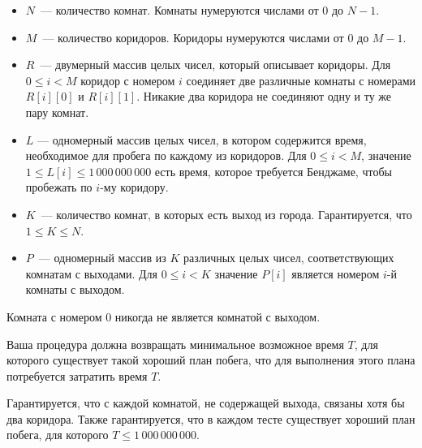 \begin{itemize}
\item $N$~--- количество комнат. Комнаты нумеруются числами от $0$ до $N-1$.
\item $M$~--- количество коридоров. Коридоры нумеруются числами от $0$ до $M-1$.
\item $R$~--- двумерный массив целых чисел, который описывает коридоры. Для $0 \le i < M$ коридор с номером $i$ соединяет две различные комнаты с номерами $R[i][0]$ и $R[i][1]$. Никакие два коридора не соединяют одну и ту же пару комнат.
\item $L$ --- одномерный массив целых чисел, в котором содержится время, необходимое для пробега по каждому из коридоров. Для $0 \le i < M$, значение $1 \le L[i] \le 1\,000\,000\,000$ есть время, которое требуется Бенджаме, чтобы пробежать по $i$-му коридору.
\item $K$~--- количество комнат, в которых есть выход из города. Гарантируется, что $1 \le K \le N$.
\item $P$~--- одномерный массив из $K$ различных целых чисел, соответствующих комнатам с выходами. Для $0 \le i < K$ значение $P[i]$ является номером $i$-й комнаты с выходом.
\end{itemize}

Комната с номером $0$ никогда не является комнатой с выходом.

Ваша процедура должна возвращать минимальное возможное время $T$, для которого существует такой хороший план побега, что для выполнения этого плана потребуется затратить время $T$.

Гарантируется, что с каждой комнатой, не содержащей выхода, связаны хотя бы два коридора. Также гарантируется, что в каждом тесте существует хороший план побега, для которого $T \le 1\,000\,000\,000$.